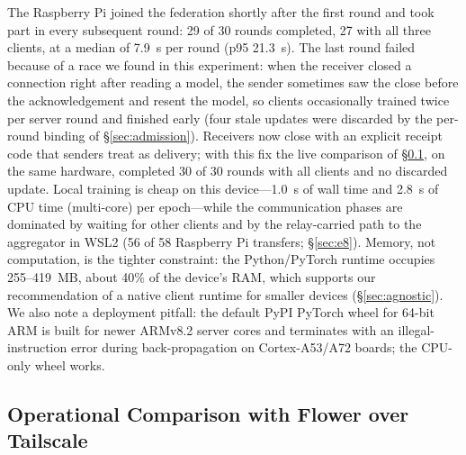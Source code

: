 The Raspberry Pi joined the federation shortly after the first round and took part in every subsequent round: 29 of 30 rounds completed, 27 with all three clients, at a median of 7.9~s per round (p95 21.3~s). The last round failed because of a race we found in this experiment: when the receiver closed a connection right after reading a model, the sender sometimes saw the close before the acknowledgement and resent the model, so clients occasionally trained twice per server round and finished early (four stale updates were discarded by the per-round binding of \S\ref{sec:admission}). Receivers now close with an explicit receipt code that senders treat as delivery; with this fix the live comparison of \S\ref{sec:flower}, on the same hardware, completed 30 of 30 rounds with all clients and no discarded update. Local training is cheap on this device---1.0~s of wall time and 2.8~s of CPU time (multi-core) per epoch---while the communication phases are dominated by waiting for other clients and by the relay-carried path to the aggregator in WSL2 (56 of 58 Raspberry Pi transfers; \S\ref{sec:e8}). Memory, not computation, is the tighter constraint: the Python/PyTorch runtime occupies 255--419~MB, about 40\% of the device's RAM, which supports our recommendation of a native client runtime for smaller devices (\S\ref{sec:agnostic}). We also note a deployment pitfall: the default PyPI PyTorch wheel for 64-bit ARM is built for newer ARMv8.2 server cores and terminates with an illegal-instruction error during back-propagation on Cortex-A53/A72 boards; the CPU-only wheel works.

\subsection{Operational Comparison with Flower over Tailscale}
\label{sec:flower}
